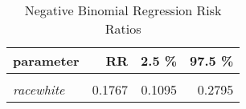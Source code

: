 \begin{table}

\caption{\label{tab:neg_bin_reg_RR}Negative Binomial Regression Risk Ratios}
\centering
\begin{tabular}[t]{>{}lrrr}
\toprule
parameter & RR & 2.5 \% & 97.5 \%\\
\midrule
\em{\cellcolor{gray!6}{(Intercept)}} & \cellcolor{gray!6}{0.5220} & \cellcolor{gray!6}{0.3512} & \cellcolor{gray!6}{0.7951}\\
\em{racewhite} & 0.1767 & 0.1095 & 0.2795\\
\bottomrule
\end{tabular}
\end{table}
